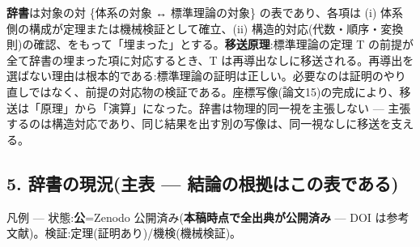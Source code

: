 \documentclass[
]{ltjsarticle}
\begin{document}
\textbf{辞書}は対象の対 \{体系の対象 ↔ 標準理論の対象\}
の表であり、各項は (i) 体系側の構成が定理または機械検証として確立、(ii)
構造的対応(代数・順序・変換則)の確認、をもって「埋まった」とする。\textbf{移送原理}:標準理論の定理
T の前提が全て辞書の埋まった項に対応するとき、T
は再導出なしに移送される。再導出を選ばない理由は根本的である:標準理論の証明は正しい。必要なのは証明のやり直しではなく、前提の対応物の検証である。座標写像(論文15)の完成により、移送は「原理」から「演算」になった。辞書は物理的同一視を主張しない
---
主張するのは構造対応であり、同じ結果を出す別の写像は、同一視なしに移送を支える。

\subsection{5. 辞書の現況(主表 ---
結論の根拠はこの表である)}\label{ux8f9eux66f8ux306eux73feux6cc1ux4e3bux8868-ux7d50ux8ad6ux306eux6839ux62e0ux306fux3053ux306eux8868ux3067ux3042ux308b}

凡例 --- 状態:\textbf{公}=Zenodo
公開済み(\textbf{本稿時点で全出典が公開済み} --- DOI
は参考文献)。検証:定理(証明あり)/機検(機械検証)。
\end{document}

